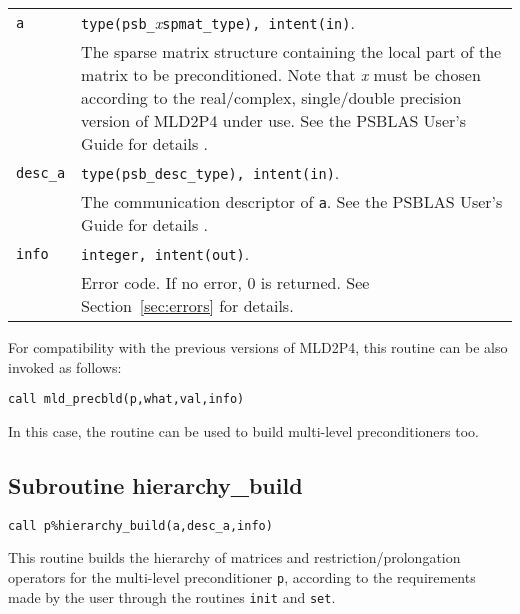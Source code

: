 \begin{tabular}{p{1.2cm}p{12cm}}
\verb|a|  & \verb|type(psb_|\emph{x}\verb|spmat_type), intent(in)|. \\
              & The sparse matrix structure containing the local part of the
                matrix to be preconditioned. Note that \emph{x} must be chosen according
                to the real/complex, single/double precision version of MLD2P4 under use.
                See the PSBLAS User's Guide for details \cite{PSBLASGUIDE}.\\
\verb|desc_a| & \verb|type(psb_desc_type), intent(in)|. \\
              & The communication descriptor of \verb|a|. See the PSBLAS User's Guide for
                details \cite{PSBLASGUIDE}.\\
\verb|info|   & \verb|integer, intent(out)|.\\
              & Error code. If no error, 0 is returned. See Section~\ref{sec:errors} for details.\\
\end{tabular}

\baselineskip
For compatibility with the previous versions of MLD2P4, this routine can be also invoked
as follows:

\begin{center}
\verb|call mld_precbld(p,what,val,info)|
\end{center}

\noindent
In this case, the routine can be used to build multi-level preconditioners too.

\clearpage

\subsection{Subroutine hierarchy\_build\label{sec:hier_bld}}
  
\begin{center}
\verb|call p%hierarchy_build(a,desc_a,info)|\\
\end{center}

\noindent
This routine builds the hierarchy of matrices and restriction/prolongation
operators for the multi-level preconditioner \verb|p|, according to the requirements
made by the user through the routines \verb|init| and \verb|set|.


